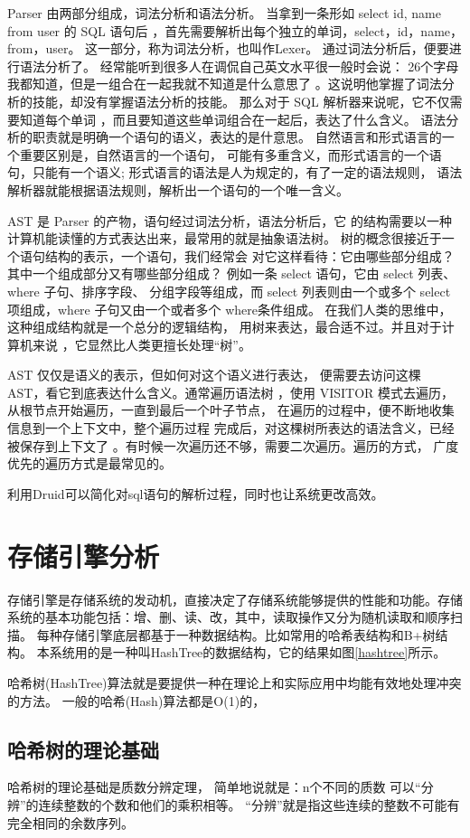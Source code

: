 Parser 由两部分组成，词法分析和语法分析。
当拿到一条形如 select id, name from user 的 SQL 语句后
，首先需要解析出每个独立的单词，select，id，name，from，user。
这一部分，称为词法分析，也叫作Lexer。
通过词法分析后，便要进行语法分析了。
经常能听到很多人在调侃自己英文水平很一般时会说：
26个字母我都知道，但是一组合在一起我就不知道是什么意思了
。这说明他掌握了词法分析的技能，却没有掌握语法分析的技能。
那么对于 SQL 解析器来说呢，它不仅需要知道每个单词
，而且要知道这些单词组合在一起后，表达了什么含义。
语法分析的职责就是明确一个语句的语义，表达的是什意思。
自然语言和形式语言的一个重要区别是，自然语言的一个语句，
可能有多重含义，而形式语言的一个语句，只能有一个语义;
形式语言的语法是人为规定的，有了一定的语法规则，
语法解析器就能根据语法规则，解析出一个语句的一个唯一含义。

AST 是 Parser 的产物，语句经过词法分析，语法分析后，它
的结构需要以一种计算机能读懂的方式表达出来，最常用的就是抽象语法树。
树的概念很接近于一个语句结构的表示，一个语句，我们经常会
对它这样看待：它由哪些部分组成？其中一个组成部分又有哪些部分组成？
例如一条 select 语句，它由 select 列表、where 子句、排序字段、
分组字段等组成，而 select 列表则由一个或多个 select 项组成，where 子句又由一个或者多个 where条件组成。
在我们人类的思维中，这种组成结构就是一个总分的逻辑结构，
用树来表达，最合适不过。并且对于计算机来说
，它显然比人类更擅长处理“树”。

AST 仅仅是语义的表示，但如何对这个语义进行表达，
便需要去访问这棵 AST，看它到底表达什么含义。通常遍历语法树
，使用 VISITOR 模式去遍历，从根节点开始遍历，一直到最后一个叶子节点，
在遍历的过程中，便不断地收集信息到一个上下文中，整个遍历过程
完成后，对这棵树所表达的语法含义，已经被保存到上下文了
。有时候一次遍历还不够，需要二次遍历。遍历的方式，
广度优先的遍历方式是最常见的。

利用Druid可以简化对sql语句的解析过程，同时也让系统更改高效。
\section{存储引擎分析}
存储引擎是存储系统的发动机，直接决定了存储系统能够提供的性能和功能。存储
系统的基本功能包括：增、删、读、改，其中，读取操作又分为随机读取和顺序扫描。
每种存储引擎底层都基于一种数据结构。比如常用的哈希表结构和B+树结构。
本系统用的是一种叫HashTree的数据结构，它的结果如图\ref{hashtree}所示。

哈希树(HashTree)算法就是要提供一种在理论上和实际应用中均能有效地处理冲突的方法。
一般的哈希(Hash)算法都是O(1)的，
\subsection{哈希树的理论基础}
哈希树的理论基础是质数分辨定理，
简单地说就是：n个不同的质数
可以“分辨”的连续整数的个数和他们的乘积相等。
“分辨”就是指这些连续的整数不可能有完全相同的余数序列。

